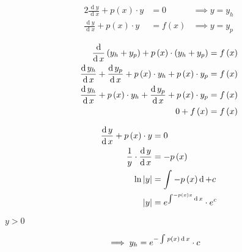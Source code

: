 \documentclass{report}
\def\lthtmlcheckvsize{\ifdim\ht\sizebox<\vsize 
  \ifdim\wd\sizebox<\hsize\expandafter\hfill\fi \expandafter\vfill
  \else\expandafter\vss\fi}%
\begin{document}
{\newpage\clearpage
{}%
\begin{alignat}{2}
  \frac{\operatorname{d}y }{\operatorname{d} x}+ p\left( x \right)\cdot  y&= 0 &\implies  y= y_h
\\
  \frac{\operatorname{d}y }{\operatorname{d} x}+ p\left( x \right)\cdot  y&= f(x) &\implies  y= y_p
\end{alignat}%
\lthtmlfigureZ
\lthtmlcheckvsize\clearpage}

{\newpage\clearpage
{}%
\begin{align}
\frac{\operatorname{d} }{\operatorname{d} x}\left( y_h+ y_p \right)+ p\left( x \right)\cdot  \left( y_h+ y_p \right)&= f\left( x \right)\notag \\
\frac{\operatorname{d}y_h }{\operatorname{d} x}+ \frac{\operatorname{d}y_p }{\operatorname{d} x}+ p\left( x \right)\cdot  y_h + p\left( x \right)\cdot  y_p   &= f\left( x \right)\notag \\
\frac{\operatorname{d}y_h }{\operatorname{d} x}+ p\left( x \right)\cdot  y_h    + \frac{\operatorname{d}y_p }{\operatorname{d} x}+ p\left( x \right)\cdot  y_p  &= f\left( x \right)\notag \\
0 +  f\left( x \right)&= f\left( x \right)
\end{align}%
\lthtmlfigureZ
\lthtmlcheckvsize\clearpage}

{\newpage\clearpage
{}%
\begin{align}
\frac{\operatorname{d}y }{\operatorname{d} x}+ p\left( x \right) \cdot  y &= 0\notag \\
\frac{1}{y}\cdot  \frac{\operatorname{d}y }{\operatorname{d} x}&= - p\left( x \right)\notag \\
\ln{ \left| y \right| }&= \int^{}_{} - p\left( x \right)  \operatorname{d}+ c\notag \\
\left| y \right|&= e^{\int^{- p\left( x \right)x}_{}   \operatorname{d}x }\cdot  e^c
\end{align}%
\lthtmlfigureZ
\lthtmlcheckvsize\clearpage}

{\newpage\clearpage
{}%
$y>0$%
\lthtmlindisplaymathZ
\lthtmlcheckvsize\clearpage}

{\newpage\clearpage
{}%
\begin{align}
\implies y_h&= e^{- \int^{}_{} p\left( x \right)  \operatorname{d}x }\cdot  c \notag
\end{align}%
\lthtmlfigureZ
\lthtmlcheckvsize\clearpage}
\end{document}
